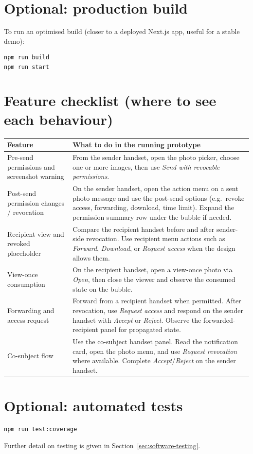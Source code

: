 \section{Optional: production build}

\noindent
To run an optimised build (closer to a deployed Next.js app, useful for a stable demo):

\begin{verbatim}
npm run build
npm run start
\end{verbatim}

\section{Feature checklist (where to see each behaviour)}


\begin{center}
\small
\begin{tabular}{@{}P{3.6cm}P{9.8cm}@{}}
\hline
\textbf{Feature} & \textbf{What to do in the running prototype} \\
\hline
Pre-send permissions and screenshot warning & From the sender handset, open the photo picker, choose one or more images, then use \emph{Send with revocable permissions}. \\
\hline
Post-send permission changes / revocation & On the sender handset, open the action menu on a sent photo message and use the post-send options (e.g.\ revoke access, forwarding, download, time limit). Expand the permission summary row under the bubble if needed. \\
\hline
Recipient view and revoked placeholder & Compare the recipient handset before and after sender-side revocation. Use recipient menu actions such as \emph{Forward}, \emph{Download}, or \emph{Request access} when the design allows them. \\
\hline
View-once consumption & On the recipient handset, open a view-once photo via \emph{Open}, then close the viewer and observe the consumed state on the bubble. \\
\hline
Forwarding and access request & Forward from a recipient handset when permitted. After revocation, use \emph{Request access} and respond on the sender handset with \emph{Accept} or \emph{Reject}. Observe the forwarded-recipient panel for propagated state. \\
\hline
Co-subject flow & Use the co-subject handset panel. Read the notification card, open the photo menu, and use \emph{Request revocation} where available. Complete \emph{Accept}/\emph{Reject} on the sender handset. \\
\hline
\end{tabular}
\end{center}

\section{Optional: automated tests}

\noindent

\begin{verbatim}
npm run test:coverage
\end{verbatim}

\noindent
Further detail on testing is given in Section~\ref{sec:software-testing}.
